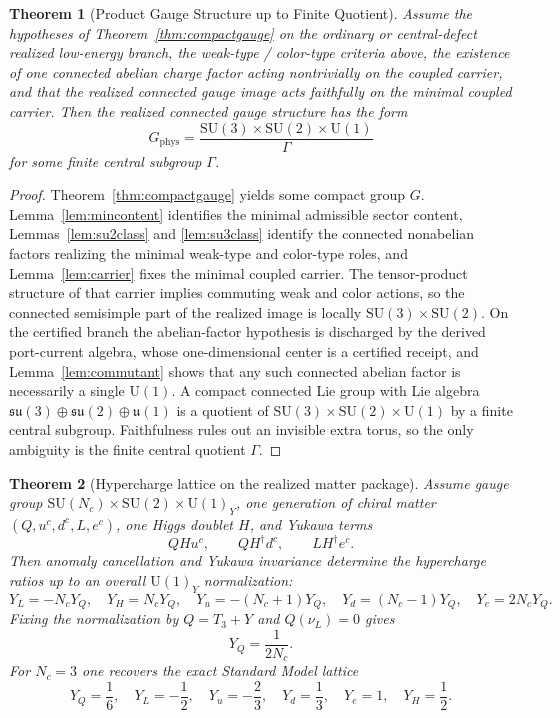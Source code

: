 \documentclass[11pt]{article}
\newtheorem{theorem}{Theorem}[section]
\newcommand{\SU}{\mathrm{SU}}
\newcommand{\U}{\mathrm{U}}
\begin{document}
\begin{theorem}[Product Gauge Structure up to Finite Quotient]\label{thm:sm}
Assume the hypotheses of Theorem~\ref{thm:compactgauge} on the ordinary or central-defect realized low-energy branch, the weak-type / color-type criteria above, the existence of one connected abelian charge factor acting nontrivially on the coupled carrier, and that the realized connected gauge image acts faithfully on the minimal coupled carrier. Then the realized connected gauge structure has the form
\[
G_{\mathrm{phys}}=
\frac{\SU(3)\times\SU(2)\times\U(1)}{\Gamma}
\]
for some finite central subgroup $\Gamma$.
\end{theorem}

\begin{proof}
Theorem~\ref{thm:compactgauge} yields some compact group $G$. Lemma~\ref{lem:mincontent} identifies the minimal admissible sector content, Lemmas~\ref{lem:su2class} and \ref{lem:su3class} identify the connected nonabelian factors realizing the minimal weak-type and color-type roles, and Lemma~\ref{lem:carrier} fixes the minimal coupled carrier. The tensor-product structure of that carrier implies commuting weak and color actions, so the connected semisimple part of the realized image is locally $\SU(3)\times\SU(2)$. On the certified branch the abelian-factor hypothesis is discharged by the derived port-current algebra, whose one-dimensional center is a certified receipt, and Lemma~\ref{lem:commutant} shows that any such connected abelian factor is necessarily a single $\U(1)$. A compact connected Lie group with Lie algebra $\mathfrak{su}(3)\oplus\mathfrak{su}(2)\oplus\mathfrak{u}(1)$ is a quotient of $\SU(3)\times\SU(2)\times\U(1)$ by a finite central subgroup. Faithfulness rules out an invisible extra torus, so the only ambiguity is the finite central quotient $\Gamma$.
\end{proof}

\begin{theorem}[Hypercharge lattice on the realized matter package]\label{thm:hypercharge}
Assume gauge group $\SU(N_c)\times\SU(2)\times\U(1)_Y$, one generation of chiral matter $(Q,u^c,d^c,L,e^c)$, one Higgs doublet $H$, and Yukawa terms
\[
QHu^c,\qquad QH^\dagger d^c,\qquad LH^\dagger e^c.
\]
Then anomaly cancellation and Yukawa invariance determine the hypercharge ratios up to an overall \(\U(1)_Y\) normalization:
\[
Y_L=-N_cY_Q,\quad
Y_H=N_cY_Q,\quad
Y_u=-(N_c+1)Y_Q,\quad
Y_d=(N_c-1)Y_Q,\quad
Y_e=2N_cY_Q.
\]
Fixing the normalization by $Q=T_3+Y$ and $Q(\nu_L)=0$ gives
\[
Y_Q=\frac{1}{2N_c}.
\]
For $N_c=3$ one recovers the exact Standard Model lattice
\[
Y_Q=\frac16,\quad
Y_L=-\frac12,\quad
Y_u=-\frac23,\quad
Y_d=\frac13,\quad
Y_e=1,\quad
Y_H=\frac12.
\]
\end{theorem}
\end{document}
